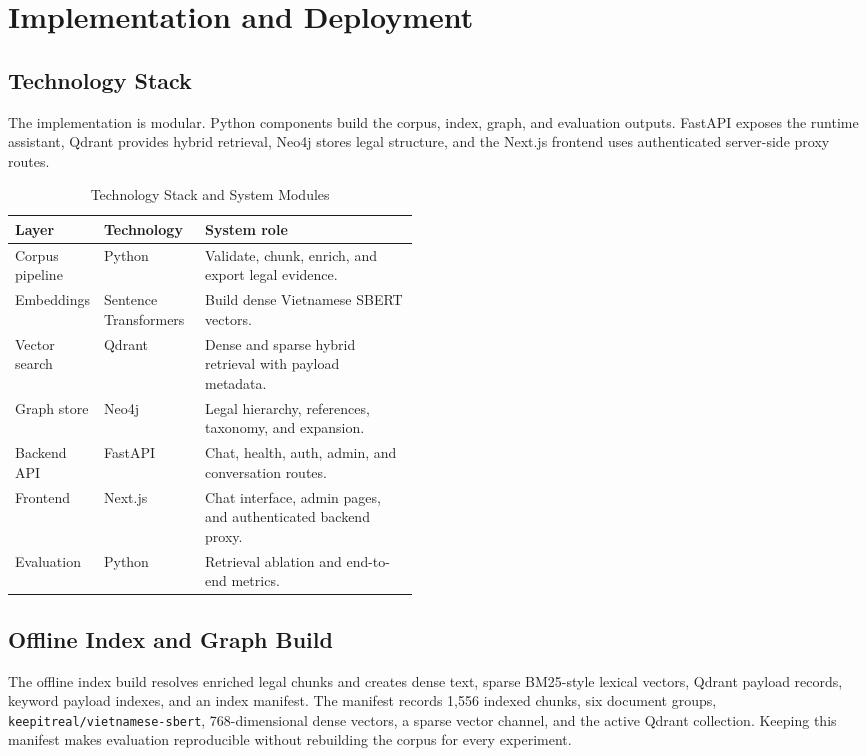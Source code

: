 \section{Implementation and Deployment}

\subsection{Technology Stack}
The implementation is modular. Python components build the corpus, index, graph, and evaluation outputs. FastAPI exposes the runtime assistant, Qdrant provides hybrid retrieval, Neo4j stores legal structure, and the Next.js frontend uses authenticated server-side proxy routes.

\begin{table}[H]
  \centering
  \caption{Technology Stack and System Modules}
  \label{tab:tech-stack-draft}
  \begin{tabularx}{\linewidth}{@{}L{0.22\linewidth}L{0.25\linewidth}Y@{}}
    \toprule
    Layer & Technology & System role \\
    \midrule
    Corpus pipeline & Python & Validate, chunk, enrich, and export legal evidence. \\
    Embeddings & Sentence Transformers & Build dense Vietnamese SBERT vectors. \\
    Vector search & Qdrant & Dense and sparse hybrid retrieval with payload metadata. \\
    Graph store & Neo4j & Legal hierarchy, references, taxonomy, and expansion. \\
    Backend API & FastAPI & Chat, health, auth, admin, and conversation routes. \\
    Frontend & Next.js & Chat interface, admin pages, and authenticated backend proxy. \\
    Evaluation & Python & Retrieval ablation and end-to-end metrics. \\
    \bottomrule
  \end{tabularx}
\end{table}

\subsection{Offline Index and Graph Build}
The offline index build resolves enriched legal chunks and creates dense text, sparse BM25-style lexical vectors, Qdrant payload records, keyword payload indexes, and an index manifest. The manifest records 1,556 indexed chunks, six document groups, \texttt{keepitreal/vietnamese-sbert}, 768-dimensional dense vectors, a sparse vector channel, and the active Qdrant collection. Keeping this manifest makes evaluation reproducible without rebuilding the corpus for every experiment.

